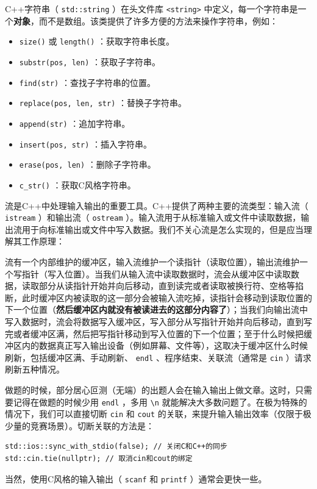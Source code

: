 C++字符串（ \texttt{std::string} ）在头文件库 \texttt{<string>} 中定义，每一个字符串是一个\textbf{对象}，而不是数组。该类提供了许多方便的方法来操作字符串，例如：
\begin{itemize}
  \item  \texttt{size()} 或 \texttt{length()} ：获取字符串长度。
  \item  \texttt{substr(pos, len)} ：获取子字符串。
  \item  \texttt{find(str)} ：查找子字符串的位置。
  \item  \texttt{replace(pos, len, str)} ：替换子字符串。
  \item  \texttt{append(str)} ：追加字符串。
  \item  \texttt{insert(pos, str)} ：插入字符串。
  \item  \texttt{erase(pos, len)} ：删除子字符串。
  \item  \texttt{c\_str()} ：获取C风格字符串。
\end{itemize}

流是C++中处理输入输出的重要工具。C++提供了两种主要的流类型：输入流（ \texttt{istream} ）和输出流（ \texttt{ostream} ）。输入流用于从标准输入或文件中读取数据，输出流用于向标准输出或文件中写入数据。我们不关心流是怎么实现的，但是应当理解其工作原理：

流有一个内部维护的缓冲区，输入流维护一个读指针（读取位置），输出流维护一个写指针（写入位置）。当我们从输入流中读取数据时，流会从缓冲区中读取数据，读取部分从读指针开始并向后移动，直到读完或者读取被换行符、空格等掐断，此时缓冲区内被读取的这一部分会被输入流吃掉，读指针会移动到读取位置的下一个位置（\textbf{然后缓冲区内就没有被读进去的这部分内容了}）；当我们向输出流中写入数据时，流会将数据写入缓冲区，写入部分从写指针开始并向后移动，直到写完或者缓冲区满，然后把写指针移动到写入位置的下一个位置；至于什么时候把缓冲区内的数据真正写入输出设备（例如屏幕、文件等），这取决于缓冲区什么时候刷新，包括缓冲区满、手动刷新、 \texttt{endl} 、程序结束、关联流（通常是 \texttt{cin} ）请求刷新五种情况。

做题的时候，部分居心叵测（无端）的出题人会在输入输出上做文章。这时，只需要记得在做题的时候少用 \texttt{endl} ，多用 \texttt{\textbackslash n} 就能解决大多数问题了。在极为特殊的情况下，我们可以直接切断 \texttt{cin} 和 \texttt{cout} 的关联，来提升输入输出效率（仅限于极少量的竞赛场景）。切断关联的方法是：
\begin{verbatim}
std::ios::sync_with_stdio(false); // 关闭C和C++的同步
std::cin.tie(nullptr); // 取消cin和cout的绑定
\end{verbatim}
当然，使用C风格的输入输出（ \texttt{scanf} 和 \texttt{printf} ）通常会更快一些。

